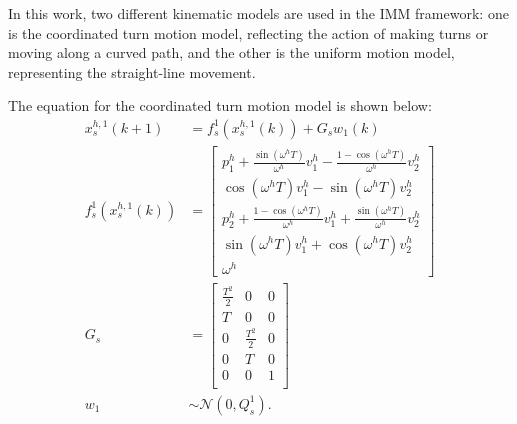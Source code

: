 \documentclass[journal]{IEEEtran}
\begin{document}
	In this work, two different kinematic models are used in the IMM framework: one is the coordinated turn motion model, reflecting the action of making turns or moving along a curved path, and the other is the uniform motion model, representing the straight-line movement. 
	
	The equation for the coordinated turn motion model is shown below:
	\begin{subequations}
		\begin{align*}
		x_s^{h,1}(k+1)&= f_s^1(x_s^{h,1}(k))+G_sw_1(k) \\ 
		f_s^1(x_s^{h,1}(k))&=\left[
		\begin{array}{c}
		p^h_1+\frac{\sin(\omega^h T)}{\omega^h}v^h_1-\frac{1-\cos(\omega^h T)}{\omega^h}v^h_2\\
		\cos(\omega^h T)v^h_1-\sin(\omega^h T)v^h_2\\
		p^h_2+\frac{1-\cos(\omega^h T)}{\omega^h}v^h_1+\frac{\sin(\omega^h T)}{\omega^h}v^h_2\\
		\sin(\omega^h T)v^h_1+\cos(\omega^h T)v^h_2\\
		\omega^h 
		\end{array}\right] \\
		G_s &= \left[
		\begin{array}{ccc}
		\frac{T^2}{2}& 0& 0\\
		T& 0& 0\\
		0& \frac{T^2}{2}& 0\\
		0& T& 0\\
		0& 0& 1\\                
		\end{array}\right] \\
		w_1&\sim\mathcal{N}(0,Q^1_s).
		\end{align*}
	\end{subequations}\normalsize
	
\end{document}
